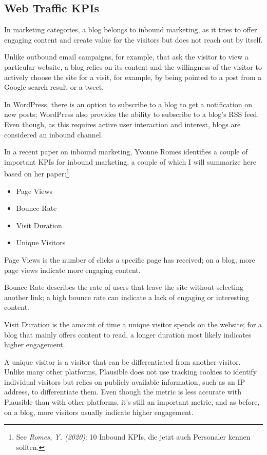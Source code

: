 \subsection{Web Traffic KPIs}

In marketing categories, a blog belongs to inbound marketing, as it tries to offer engaging content and create value for the visitors but does not reach out by itself. 

Unlike outbound email campaigns, for example, that ask the visitor to view a particular website, a blog relies on its content and the willingness of the visitor to actively choose the site for a visit, for example, by being pointed to a post from a Google search result or a tweet.

In WordPress, there is an option to subscribe to a blog to get a notification on new posts; WordPress also provides the ability to subscribe to a blog's RSS feed. Even though, as this requires active user interaction and interest, blogs are considered an inbound channel.

In a recent paper on inbound marketing, Yvonne Romes identifies a couple of important KPIs for inbound marketing, a couple of which I will summarize here based on her paper:\footnote{See \textit{Romes, Y. (2020)}: 10 Inbound KPIs, die jetzt auch Personaler kennen sollten.\cite{inboundKPI}}

\begin{itemize}
\item Page Views
\item Bounce Rate
\item Visit Duration
\item Unique Visitors
\end{itemize}

Page Views is the number of clicks a specific page has received; on a blog, more page views indicate more engaging content.

Bounce Rate describes the rate of users that leave the site without selecting another link; a high bounce rate can indicate a lack of engaging or interesting content.

Visit Duration is the amount of time a unique visitor spends on the website; for a blog that mainly offers content to read, a longer duration most likely indicates higher engagement.

A unique visitor is a visitor that can be differentiated from another visitor. Unlike many other platforms, Plausible does not use tracking cookies to identify individual visitors but relies on publicly available information, such as an IP address, to differentiate them. Even though the metric is less accurate with Plausible than with other platforms, it's still an important metric, and as before, on a blog, more visitors usually indicate higher engagement.

